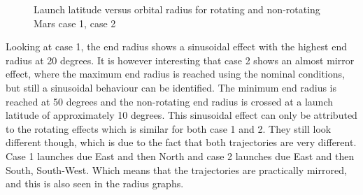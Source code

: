 \begin{figure}[H]
\centering
{} 
\caption{Launch latitude versus orbital radius for rotating and non-rotating Mars \protect{} case 1,  \protect{} case 2 } 
\label{fig:launchLatitudeVsRadiusCase1combined} 
\end{figure} 

\noindent
Looking at case 1, the end radius shows a sinusoidal effect with the highest end radius at 20 degrees. It is however interesting that case 2 shows an almost mirror effect, where the maximum end radius is reached using the nominal conditions, but still a sinusoidal behaviour can be identified. The minimum end radius is reached at 50 degrees and the non-rotating end radius is crossed at a launch latitude of approximately 10 degrees. This sinusoidal effect can only be attributed to the rotating effects which is similar for both case 1 and 2. They still look different though, which is due to the fact that both trajectories are very different. Case 1 launches due East and then North and case 2 launches due East and then South, South-West. Which means that the trajectories are practically mirrored, and this is also seen in the radius graphs. \\

